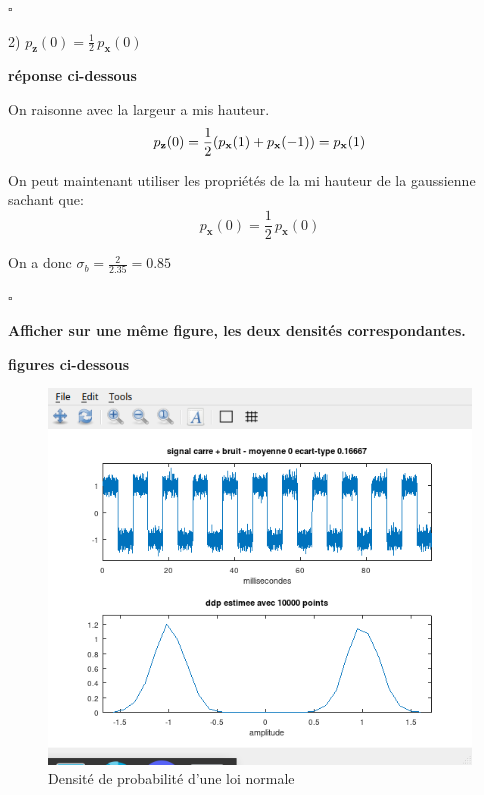 \documentclass{article}
\newcommand{\debutrep}[1]{\color{blue}\begin{center} \hrulefill \textbf{ #1 } \hrulefill \end{center} }
\newcommand{\finrep}{\vspace*{5mm}\hfill $\square$\color{black}\vspace*{5mm}}
\begin{document}
\begin{list}{}{\setlength{\leftmargin}{10mm} \setlength{\labelwidth}{20mm} \setlength{\labelsep}{3mm} \setlength{\itemsep}{1mm} }
\finrep

\item[2)] ${\displaystyle p_{\mathbf{z}}(0) = \frac{1}{2} \, p_{\mathbf{x}}(0)}$

\debutrep{réponse ci-dessous}
On raisonne avec la largeur a mis hauteur.
\[
p_{\mathbf{z}}(0) = \frac{1}{2}(  p_{\mathbf{x}}(1)+ p_\mathbf{x}(-1))=p_{\mathbf{x}}(1)\\
\]

On peut maintenant utiliser les propriétés de la mi hauteur de la gaussienne sachant que:
\[
{\displaystyle p_{\mathbf{x}}(0) = \frac{1}{2} \, p_{\mathbf{x}}(0)}
\]

On a donc $\sigma_b= \frac{2}{2.35}=0.85$ 

\finrep

\end{list}

\textbf{Afficher sur une même figure, les deux densités correspondantes.}

\debutrep{figures ci-dessous}

\begin{figure} [H]
    \centering
    \includegraphics[width=\columnwidth]{Part3-1.png}
    \caption{Densité de probabilité d'une loi normale}
\end{figure}
\end{document}
